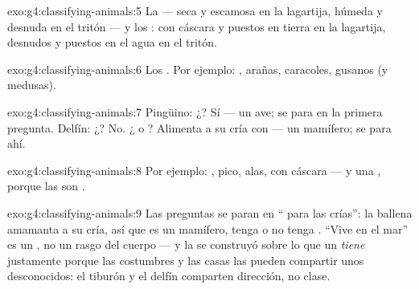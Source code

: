 \begin{solution}{exo:g4:classifying-animals:5}
La  --- seca y escamosa en la lagartija, húmeda y desnuda en el
tritón --- y los : con cáscara y puestos en tierra en la
lagartija, desnudos y puestos en el agua en el tritón.
\end{solution}

\begin{solution}{exo:g4:classifying-animals:6}
Los . Por ejemplo: , arañas, caracoles, gusanos
(y medusas).
\end{solution}

\begin{solution}{exo:g4:classifying-animals:7}
Pingüino: ¿? Sí --- un ave; se para en la primera pregunta.
Delfín: ¿? No. ¿ o ? Alimenta a su cría con  ---
un mamífero; se para ahí.
\end{solution}

\begin{solution}{exo:g4:classifying-animals:8}
Por ejemplo: , pico, alas,  con cáscara --- y una , porque las  son .
\end{solution}

\begin{solution}{exo:g4:classifying-animals:9}
Las preguntas se paran en `` para las crías'': la ballena
amamanta a su cría, así que es un mamífero, tenga o no tenga .
``Vive en el mar'' es un , no un rasgo del cuerpo --- y la
 se construyó sobre lo que un  \emph{tiene}
justamente porque las costumbres y las casas las pueden compartir unos
desconocidos: el tiburón y el delfín comparten dirección, no clase.
\end{solution}

